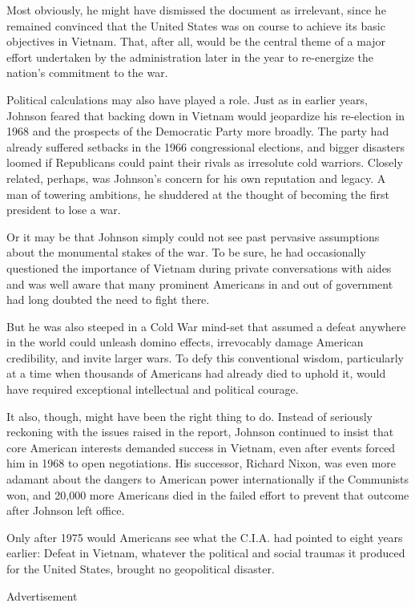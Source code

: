 Most obviously, he might have dismissed the document as irrelevant,
since he remained convinced that the United States was on course to
achieve its basic objectives in Vietnam. That, after all, would be the
central theme of a major effort undertaken by the administration later
in the year to re-energize the nation's commitment to the war.

Political calculations may also have played a role. Just as in earlier
years, Johnson feared that backing down in Vietnam would jeopardize his
re-election in 1968 and the prospects of the Democratic Party more
broadly. The party had already suffered setbacks in the 1966
congressional elections, and bigger disasters loomed if Republicans
could paint their rivals as irresolute cold warriors. Closely related,
perhaps, was Johnson's concern for his own reputation and legacy. A man
of towering ambitions, he shuddered at the thought of becoming the first
president to lose a war.

Or it may be that Johnson simply could not see past pervasive
assumptions about the monumental stakes of the war. To be sure, he had
occasionally questioned the importance of Vietnam during private
conversations with aides and was well aware that many prominent
Americans in and out of government had long doubted the need to fight
there.

But he was also steeped in a Cold War mind-set that assumed a defeat
anywhere in the world could unleash domino effects, irrevocably damage
American credibility, and invite larger wars. To defy this conventional
wisdom, particularly at a time when thousands of Americans had already
died to uphold it, would have required exceptional intellectual and
political courage.

It also, though, might have been the right thing to do. Instead of
seriously reckoning with the issues raised in the report, Johnson
continued to insist that core American interests demanded success in
Vietnam, even after events forced him in 1968 to open negotiations. His
successor, Richard Nixon, was even more adamant about the dangers to
American power internationally if the Communists won, and 20,000 more
Americans died in the failed effort to prevent that outcome after
Johnson left office.

Only after 1975 would Americans see what the C.I.A. had pointed to eight
years earlier: Defeat in Vietnam, whatever the political and social
traumas it produced for the United States, brought no geopolitical
disaster.

Advertisement

